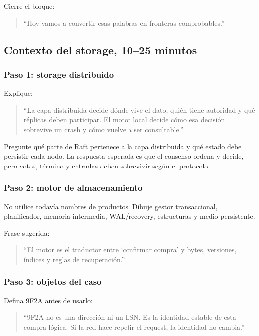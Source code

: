 \documentclass[variant=docente,cover=institutional,mode=screen]{ua-engineering-v6-article}
\begin{document}
Cierre el bloque:

\begin{quote}
``Hoy vamos a convertir esas palabras en fronteras comprobables.''
\end{quote}

\subsection{Contexto del storage, 10--25 minutos}

\subsubsection*{Paso 1: storage distribuido}

Explique:

\begin{quote}
``La capa distribuida decide dónde vive el dato, quién tiene autoridad y qué réplicas deben participar. El motor local decide cómo esa decisión sobrevive un crash y cómo vuelve a ser consultable.''
\end{quote}

Pregunte qué parte de Raft pertenece a la capa distribuida y qué estado debe persistir cada nodo. La respuesta esperada es que el consenso ordena y decide, pero votos, término y entradas deben sobrevivir según el protocolo.

\subsubsection*{Paso 2: motor de almacenamiento}

No utilice todavía nombres de productos. Dibuje gestor transaccional, planificador, memoria intermedia, WAL/recovery, estructuras y medio persistente.

Frase sugerida:

\begin{quote}
``El motor es el traductor entre `confirmar compra' y bytes, versiones, índices y reglas de recuperación.''
\end{quote}

\subsubsection*{Paso 3: objetos del caso}

Defina 9F2A antes de usarlo:

\begin{quote}
``9F2A no es una dirección ni un LSN. Es la identidad estable de esta compra lógica. Si la red hace repetir el request, la identidad no cambia.''
\end{quote}
\end{document}
